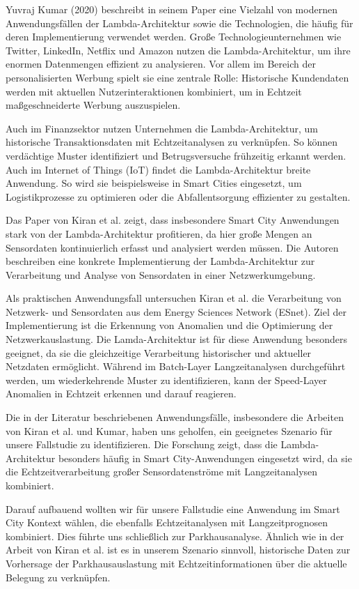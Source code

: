 Yuvraj Kumar (2020) beschreibt in seinem Paper eine Vielzahl von modernen Anwendungsfällen der Lambda-Architektur sowie die Technologien, die häufig für deren Implementierung verwendet werden. Große Technologieunternehmen wie Twitter, LinkedIn, Netflix und Amazon nutzen die Lambda-Architektur, um ihre enormen Datenmengen effizient zu analysieren. Vor allem im Bereich der personalisierten Werbung spielt sie eine zentrale Rolle: Historische Kundendaten werden mit aktuellen Nutzerinteraktionen kombiniert, um in Echtzeit maßgeschneiderte Werbung auszuspielen.

Auch im Finanzsektor nutzen Unternehmen die Lambda-Architektur, um historische Transaktionsdaten mit Echtzeitanalysen zu verknüpfen. So können verdächtige Muster identifiziert und Betrugsversuche frühzeitig erkannt werden. Auch im Internet of Things (IoT) findet die Lambda-Architektur breite Anwendung. So wird sie beispielsweise in Smart Cities eingesetzt, um Logistikprozesse zu optimieren oder die Abfallentsorgung effizienter zu gestalten.

Das Paper von Kiran et al. zeigt, dass insbesondere Smart City Anwendungen stark von der Lambda-Architektur profitieren, da hier große Mengen an Sensordaten kontinuierlich erfasst und analysiert werden müssen. Die Autoren beschreiben eine konkrete Implementierung der Lambda-Architektur zur Verarbeitung und Analyse von Sensordaten in einer Netzwerkumgebung.

Als praktischen Anwendungsfall untersuchen Kiran et al. die Verarbeitung von Netzwerk- und Sensordaten aus dem Energy Sciences Network (ESnet). Ziel der Implementierung ist die Erkennung von Anomalien und die Optimierung der Netzwerkauslastung. Die Lamda-Architektur ist für diese Anwendung besonders geeignet, da sie die gleichzeitige Verarbeitung historischer und aktueller Netzdaten ermöglicht. Während im Batch-Layer Langzeitanalysen durchgeführt werden, um wiederkehrende Muster zu identifizieren, kann der Speed-Layer Anomalien in Echtzeit erkennen und darauf reagieren. 

Die in der Literatur beschriebenen Anwendungsfälle, insbesondere die Arbeiten von Kiran et al. und Kumar, haben uns geholfen, ein geeignetes Szenario für unsere Fallstudie zu identifizieren. Die Forschung zeigt, dass die Lambda-Architektur besonders häufig in Smart City-Anwendungen eingesetzt wird, da sie die Echtzeitverarbeitung großer Sensordatenströme mit Langzeitanalysen kombiniert.

Darauf aufbauend wollten wir für unsere Fallstudie eine Anwendung im Smart City Kontext wählen, die ebenfalls Echtzeitanalysen mit Langzeitprognosen kombiniert. Dies führte uns schließlich zur Parkhausanalyse. Ähnlich wie in der Arbeit von Kiran et al. ist es in unserem Szenario sinnvoll, historische Daten zur Vorhersage der Parkhausauslastung mit Echtzeitinformationen über die aktuelle Belegung zu verknüpfen.
